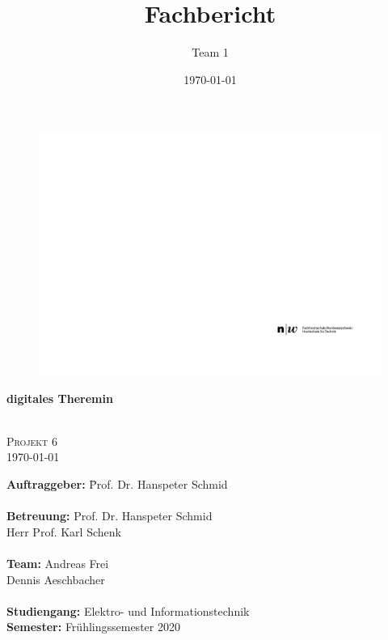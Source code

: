 \documentclass[final]{fhnwreport}       %
\title{Fachbericht}  		        %
\author{Team 1}      				    %
\date{\today}          				   %
\begin{document}
\thispagestyle{empty}
	\begin{figure}
		 \vspace*{-\topskip}\vspace*{-\headsep}
		\includegraphics[scale=1]{graphics/fhnw_ht_logo_de.pdf}
	\end{figure}
	\begin{center}
		\vspace*{2cm}
		{\huge{\textbf{digitales Theremin}}}\\
		\vspace*{0.2cm}
		{\huge{\textbf{\thetitle}}}\\
		\vspace*{0.5cm}
		
		{\scshape\Large Projekt 6\\} \Large{\today}
		\vfill
		\begin{normalsize}
			{\begin{tabbing}
					\textbf{Auftraggeber:} \hspace{5cm}\= Prof. Dr. Hanspeter Schmid\\
					
					\\[0.8cm]
					\textbf{Betreuung:} 
					\>Prof. Dr. Hanspeter Schmid\\
					\>Herr Prof. Karl Schenk\\


					\\[0.8cm]
					\textbf{Team:} \>Andreas Frei \\ \>Dennis Aeschbacher \\ 

					\\[0.8cm]
					\textbf{Studiengang:} \>Elektro- und Informationstechnik
					\\[0.8cm]	\textbf{Semester:} \>Frühlingssemester 2020
			\end{tabbing}}
		\end{normalsize}
		\vfill
	\end{center}
\clearpage
			
\end{document}
